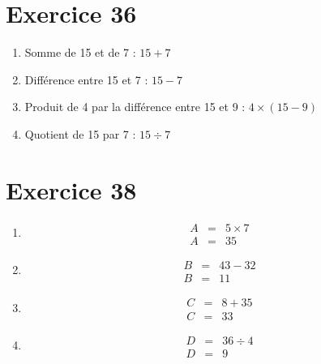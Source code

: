 \section*{Exercice 36}

\begin{enumerate}[label = \alph*.]
	\item Somme de 15 et de 7 : $15 + 7$
	\item Différence entre 15 et 7 : $15 - 7$
	\item Produit de 4 par la différence entre 15 et 9 : $4 \times (15 - 9)$
	\item Quotient de 15 par 7 : $15 \div 7$
\end{enumerate}

\section*{Exercice 38}

\begin{multicols}{4}
	\begin{enumerate}[label=\alph*.]
	\item \begin{eqnarray*}
		A &=& 5 \times 7 \\
		A &=& 35
	\end{eqnarray*}

	\item \begin{eqnarray*}
		B &=& 43 - 32 \\
		B &=& 11
	\end{eqnarray*}

	\item \begin{eqnarray*}
		C &=& 8 + 35 \\
		C &=& 33
	\end{eqnarray*}

	\item \begin{eqnarray*}
		D &=& 36 \div 4 \\
		D &=& 9
	\end{eqnarray*}
\end{enumerate}
\end{multicols}

